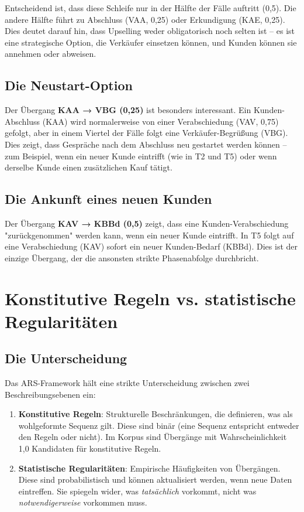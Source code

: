 \documentclass[12pt,a4paper]{article}
\begin{document}
Entscheidend ist, dass diese Schleife nur in der Hälfte der Fälle auftritt
(0,5). Die andere Hälfte führt zu Abschluss (VAA, 0,25) oder Erkundigung
(KAE, 0,25). Dies deutet darauf hin, dass Upselling weder obligatorisch noch
selten ist – es ist eine strategische Option, die Verkäufer einsetzen können,
und Kunden können sie annehmen oder abweisen.

\subsection{Die Neustart-Option}

Der Übergang \textbf{KAA → VBG (0,25)} ist besonders interessant.
Ein Kunden-Abschluss (KAA) wird normalerweise von einer Verabschiedung (VAV,
0,75) gefolgt, aber in einem Viertel der Fälle folgt eine Verkäufer-Begrüßung
(VBG). Dies zeigt, dass Gespräche nach dem Abschluss neu gestartet werden
können – zum Beispiel, wenn ein neuer Kunde eintrifft (wie in T2 und T5)
oder wenn derselbe Kunde einen zusätzlichen Kauf tätigt.

\subsection{Die Ankunft eines neuen Kunden}

Der Übergang \textbf{KAV → KBBd (0,5)} zeigt, dass eine Kunden-Verabschiedung
"zurückgenommen" werden kann, wenn ein neuer Kunde eintrifft. In T5 folgt
auf eine Verabschiedung (KAV) sofort ein neuer Kunden-Bedarf (KBBd). Dies
ist der einzige Übergang, der die ansonsten strikte Phasenabfolge durchbricht.

\section{Konstitutive Regeln vs. statistische Regularitäten}

\subsection{Die Unterscheidung}

Das ARS-Framework hält eine strikte Unterscheidung zwischen zwei
Beschreibungsebenen ein:

\begin{enumerate}
    \item \textbf{Konstitutive Regeln}: Strukturelle Beschränkungen, die
    definieren, was als wohlgeformte Sequenz gilt. Diese sind binär (eine
    Sequenz entspricht entweder den Regeln oder nicht). Im Korpus sind
    Übergänge mit Wahrscheinlichkeit 1,0 Kandidaten für konstitutive Regeln.
    
    \item \textbf{Statistische Regularitäten}: Empirische Häufigkeiten von
    Übergängen. Diese sind probabilistisch und können aktualisiert werden,
    wenn neue Daten eintreffen. Sie spiegeln wider, was \textit{tatsächlich}
    vorkommt, nicht was \textit{notwendigerweise} vorkommen muss.
\end{enumerate}
\end{document}
